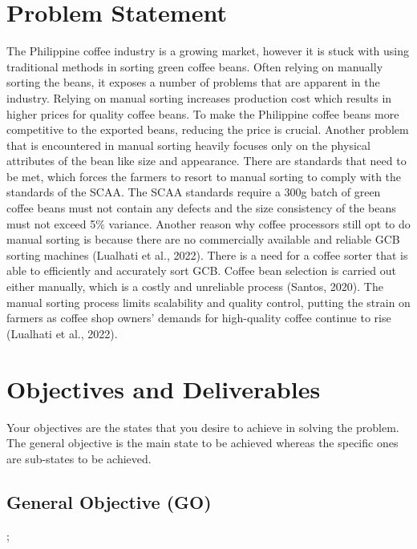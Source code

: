 \section{Problem Statement}
The Philippine coffee industry is a growing market, however it is stuck with using traditional methods in sorting green coffee beans. Often relying on manually sorting the beans, it exposes a number of problems that are apparent in the industry. Relying on manual sorting increases production cost which results in higher prices for quality coffee beans. To make the Philippine coffee beans more competitive to the exported beans, reducing the price is crucial. Another problem that is encountered in manual sorting heavily focuses only on the physical attributes of the bean like size and appearance. There are standards that need to be met, which forces the farmers to resort to manual sorting to comply with the standards of the SCAA. The SCAA standards require a 300g batch of green coffee beans must not contain any defects and the size consistency of the beans must not exceed 5\% variance. Another reason why coffee processors still opt to do manual sorting is because there are no commercially available and reliable GCB sorting machines (Lualhati et al., 2022). There is a need for a coffee sorter that is able to efficiently and accurately sort GCB. Coffee bean selection is carried out either manually, which is a costly and unreliable process (Santos, 2020). The manual sorting process limits scalability and quality control, putting the strain on farmers as coffee shop owners' demands for high-quality coffee continue to rise (Lualhati et al., 2022).   	 	 

\section{Objectives and Deliverables}

Your objectives are the states that you desire to achieve in solving the problem. The general objective is the main state to be achieved whereas the specific ones are sub-states to be achieved.

\subsection{General Objective (GO)}
 ;


